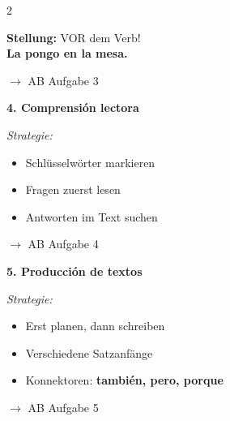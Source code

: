 \documentclass[11pt, a4paper]{article}
\newcommand{\seriftext}[1]{{\fontfamily{ppl}\selectfont #1}}
\newcommand{\es}[1]{\seriftext{\textbf{#1}}}
\newcommand{\abmark}[1]{{\footnotesize\textcolor{akzent}{$\rightarrow$ AB #1}}}
\newcommand{\abschnitt}[2]{\noindent\textbf{\large #1. #2}}
\begin{document}
\begin{multicols}{2}
\begin{grammatikbox}
\vspace{3pt}

\textbf{Stellung:} VOR dem Verb!\\
\es{La pongo en la mesa.}
\end{grammatikbox}

\abmark{Aufgabe 3}

\vspace{8pt}

\abschnitt{4}{Comprensión lectora}

\vspace{4pt}

\begin{tippbox}
\footnotesize\textit{Strategie:}
\begin{itemize}[leftmargin=1em, itemsep=0pt]
    \item Schlüsselwörter markieren
    \item Fragen zuerst lesen
    \item Antworten im Text suchen
\end{itemize}
\end{tippbox}

\abmark{Aufgabe 4}

\vspace{6pt}

\abschnitt{5}{Producción de textos}

\vspace{4pt}

\begin{tippbox}
\footnotesize\textit{Strategie:}
\begin{itemize}[leftmargin=1em, itemsep=0pt]
    \item Erst planen, dann schreiben
    \item Verschiedene Satzanfänge
    \item Konnektoren: \es{también, pero, porque}
\end{itemize}
\end{tippbox}

\abmark{Aufgabe 5}

\end{multicols}


\vspace{6pt}
\end{document}
